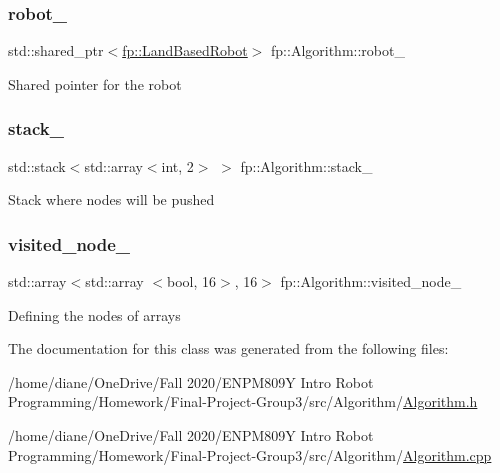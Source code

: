 \mbox{\label{classfp_1_1_algorithm_a9937e133d060b6216a30055dc400ac10}} 
\subsubsection{\texorpdfstring{robot\+\_\+}{robot\_}}
{\footnotesize\ttfamily std\+::shared\+\_\+ptr$<$\hyperlink{classfp_1_1_land_based_robot}{fp\+::\+Land\+Based\+Robot}$>$ fp\+::\+Algorithm\+::robot\+\_\+}

Shared pointer for the robot \mbox{\label{classfp_1_1_algorithm_a3a646d05e1d457e73608134417b55113}} 
\subsubsection{\texorpdfstring{stack\+\_\+}{stack\_}}
{\footnotesize\ttfamily std\+::stack$<$std\+::array$<$int, 2$>$ $>$ fp\+::\+Algorithm\+::stack\+\_\+}

Stack where nodes will be pushed \mbox{\label{classfp_1_1_algorithm_a41904cf962dd8c46901d39ab03d77545}} 
\subsubsection{\texorpdfstring{visited\+\_\+node\+\_\+}{visited\_node\_}}
{\footnotesize\ttfamily std\+::array$<$std\+::array $<$bool, 16$>$, 16$>$ fp\+::\+Algorithm\+::visited\+\_\+node\+\_\+\hspace{0.3cm}{\ttfamily [protected]}}

Defining the nodes of arrays 

The documentation for this class was generated from the following files\+:\begin{DoxyCompactItemize}
\item 
/home/diane/\+One\+Drive/\+Fall 2020/\+E\+N\+P\+M809\+Y Intro Robot Programming/\+Homework/\+Final-\/\+Project-\/\+Group3/src/\+Algorithm/\hyperlink{_algorithm_8h}{Algorithm.\+h}\item 
/home/diane/\+One\+Drive/\+Fall 2020/\+E\+N\+P\+M809\+Y Intro Robot Programming/\+Homework/\+Final-\/\+Project-\/\+Group3/src/\+Algorithm/\hyperlink{_algorithm_8cpp}{Algorithm.\+cpp}\end{DoxyCompactItemize}
